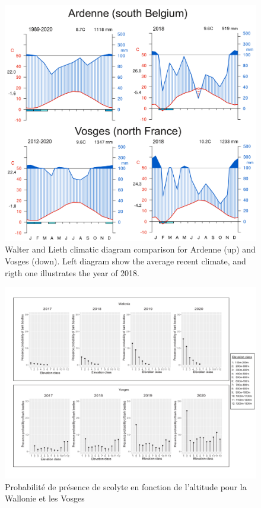 \documentclass[3p,times]{elsarticle}
\begin{document}
\begin{figure} [htbp] 
	\centering
	\includegraphics[width=1\textwidth]{diagrammeOT-page001.png}
	\caption{Walter and Lieth climatic diagram comparison for Ardenne (up) and Vosges (down). Left diagram show the average recent climate, and rigth one illustrates the year of 2018.}
	\label{fig:diagOT}
\end{figure}


\begin{figure} [htbp] 
		\centering
		\includegraphics[width=1\textwidth]{Wall_vs_vosges.png}
		\caption{Probabilité de présence de scolyte en fonction de l'altitude pour la Wallonie et les Vosges}
		\label{fig:sco_alti}
\end{figure}
	
\end{document}

